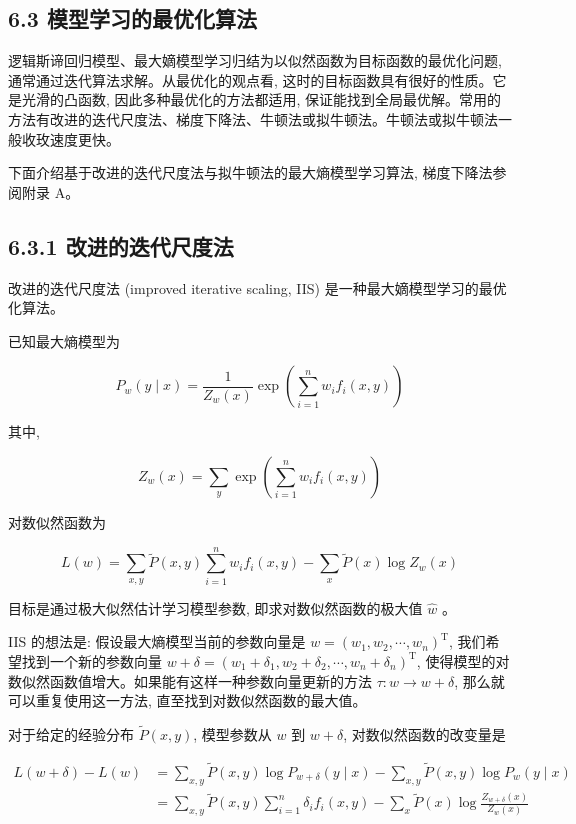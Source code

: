 \documentclass[10pt]{article}
\begin{document}
\begin{CJK*}{UTF8}{bsmi}
\section*{6.3 模型学习的最优化算法}
逻辑斯谛回归模型、最大嫡模型学习归结为以似然函数为目标函数的最优化问题, 通常通过迭代算法求解。从最优化的观点看, 这时的目标函数具有很好的性质。它是光滑的凸函数, 因此多种最优化的方法都适用, 保证能找到全局最优解。常用的方法有改进的迭代尺度法、梯度下降法、牛顿法或拟牛顿法。牛顿法或拟牛顿法一般收玫速度更快。

下面介绍基于改进的迭代尺度法与拟牛顿法的最大熵模型学习算法, 梯度下降法参阅附录 A。

\subsection*{6.3.1 改进的迭代尺度法}
改进的迭代尺度法 (improved iterative scaling, IIS) 是一种最大嫡模型学习的最优化算法。

已知最大熵模型为

$$
P_{w}(y \mid x)=\frac{1}{Z_{w}(x)} \exp \left(\sum_{i=1}^{n} w_{i} f_{i}(x, y)\right)
$$

其中,

$$
Z_{w}(x)=\sum_{y} \exp \left(\sum_{i=1}^{n} w_{i} f_{i}(x, y)\right)
$$

对数似然函数为

$$
L(w)=\sum_{x, y} \tilde{P}(x, y) \sum_{i=1}^{n} w_{i} f_{i}(x, y)-\sum_{x} \tilde{P}(x) \log Z_{w}(x)
$$

目标是通过极大似然估计学习模型参数, 即求对数似然函数的极大值 $\hat{w}$ 。

IIS 的想法是: 假设最大熵模型当前的参数向量是 $w=\left(w_{1}, w_{2}, \cdots, w_{n}\right)^{\mathrm{T}}$, 我们希望找到一个新的参数向量 $w+\delta=\left(w_{1}+\delta_{1}, w_{2}+\delta_{2}, \cdots, w_{n}+\delta_{n}\right)^{\mathrm{T}}$, 使得模型的对数似然函数值增大。如果能有这样一种参数向量更新的方法 $\tau: w \rightarrow w+\delta$, 那么就可以重复使用这一方法, 直至找到对数似然函数的最大值。

对于给定的经验分布 $\tilde{P}(x, y)$, 模型参数从 $w$ 到 $w+\delta$, 对数似然函数的改变量是

$$
\begin{aligned}
L(w+\delta)-L(w) & =\sum_{x, y} \tilde{P}(x, y) \log P_{w+\delta}(y \mid x)-\sum_{x, y} \tilde{P}(x, y) \log P_{w}(y \mid x) \\
& =\sum_{x, y} \tilde{P}(x, y) \sum_{i=1}^{n} \delta_{i} f_{i}(x, y)-\sum_{x} \tilde{P}(x) \log \frac{Z_{w+\delta}(x)}{Z_{w}(x)}
\end{aligned}
$$


\end{CJK*}
\end{document}
